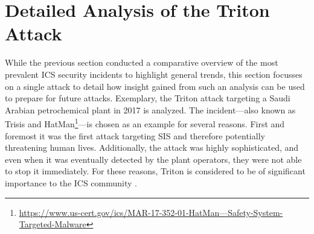 \documentclass[runningheads]{llncs}
\begin{document}
\section{Detailed Analysis of the Triton Attack}
\label{section:triton}
While the previous section conducted a comparative overview of the most prevalent ICS security incidents to highlight general trends, this section focusses on a single attack to detail how insight gained from such an analysis can be used to prepare for future attacks.
Exemplary, the Triton attack targeting a Saudi Arabian petrochemical plant in 2017 is analyzed.
The incident---also known as Trisis \cite{dragos.17} and HatMan\footnote{\url{https://www.us-cert.gov/ics/MAR-17-352-01-HatMan—Safety-System-Targeted-Malware}}---is chosen as an example for several reasons.
First and foremost it was the first attack targeting SIS and therefore potentially threatening human lives.
Additionally, the attack was highly sophisticated, and even when it was eventually detected by the plant operators, they were not able to stop it immediately.
For these reasons, Triton is considered to be of significant importance to the ICS community \cite{dragos.17}.
\end{document}
